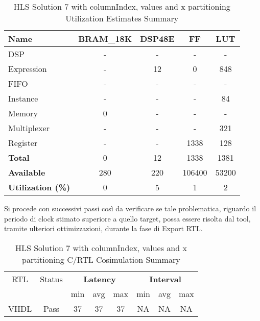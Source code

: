 \begin{table}[H]
	\centering
	\begin{tabular}{|l|c|c|c|c|}
		\hline
		\textbf{Name}    & \textbf{BRAM\_18K} & \textbf{DSP48E} & \textbf{FF} & \textbf{LUT} \\ \hline
		DSP              & -                   & -               & -           & -            \\ 
		Expression       & -                   & 12              & 0           & 848          \\ 
		FIFO             & -                   & -               & -           & -            \\ 
		Instance         & -                   & -               & -           & 84            \\ 
		Memory           & 0                   & -               & -          & -            \\ 
		Multiplexer      & -                   & -               & -           & 321          \\ 
		Register         & -                   & -               & 1338         & 128            \\ \hline
		\textbf{Total}   & 0                   & 12               & 1338         & 1381          \\ \hline
		\textbf{Available} & 280               & 220             & 106400      & 53200        \\ \hline
		\textbf{Utilization (\%)} & 0            & 5               & 1     & 2      \\ \hline
	\end{tabular}
	\caption{HLS Solution 7 with columnIndex, values and x partitioning Utilization Estimates Summary}
	\label{tab:hls-solution-7-columnindex-values-x-partitioning-utilization-estimates-summary}
\end{table}

Si procede con successivi passi così da verificare se tale problematica, riguardo il periodo di clock stimato superiore a quello target, possa essere risolta dal tool, tramite ulteriori ottimizzazioni, durante la fase di Export RTL.

\begin{table}[H]
	\centering
	\begin{tabular}{|c|c|c|c|c|c|c|c|}
		\hline
		\multicolumn{1}{|c|}{RTL} & \multicolumn{1}{|c|}{Status} & \multicolumn{3}{c|}{\textbf{Latency}} & \multicolumn{3}{c|}{\textbf{Interval}} \\
		&  & min & avg & max & min & avg & max \\
		\hline
		VHDL & Pass & 37 & 37 & 37 & NA & NA & NA \\
		\hline
	\end{tabular}
	\caption{HLS Solution 7 with columnIndex, values and x partitioning C/RTL Cosimulation Summary }
	\label{tab:hls-solution-7-columnindex-values-x-partitioning-cosimulation-summary}
\end{table}


